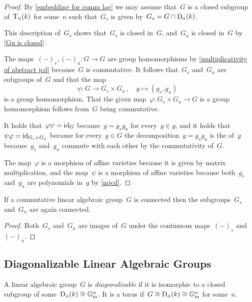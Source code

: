 \begin{proof}
  By \cref{embedding for comm lag} we may assume that~$G$ is a closed subgroup of~$\operatorname{T}_n(k)$ for some~$n$ such that~$G_s$ is given by~$G_s = G \cap \operatorname{D}_n(k)$.
  
  This description of~$G_s$ shows that~$G_s$ is closed in~$G$, and~$G_u$ is closed in~$G$ by \cref{Gu is closed}.
  
  The maps~$(-)_s, (-)_u \colon G \to G$ are group homomorphisms by \cref{multiplicativity of abstract jcd} because~$G$ is commutative.
  It follows that~$G_s$ and~$G_u$ are subgroups of~$G$ and that the map
  \[
            \psi
    \colon  G
    \to     G_s \times G_u \,,
    \quad   g
    \mapsto (g_s, g_u)
  \]
  is a group homomorphism.
  That the given map~$\varphi \colon G_s \times G_u \to G$ is a group homomorphism follows from~$G$ being commutative.
  
  It holds that~$\varphi \psi = \operatorname{id}_G$ because~$g = g_s g_u$ for every~$g \in g$, and it holds that~$\psi \varphi = \operatorname{id}_{G_s \times G_u}$ because for every~$g \in G$ the decomposition~$g = g_s g_u$ is the {\JCD} of~$g$ because~$g_s$ and~$g_u$ commute with each other by the commutativity of~$G$.
  
  The map~$\varphi$ is a morphism of affine varieties because it is given by matrix multiplication, and the map~$\psi$ is a morphism of affine varieties because both~$g_s$ and~$g_u$ are polynomials in~$g$ by \cref{mjcd}.
\end{proof}


\begin{corollary}
  If a commutative linear algebraic group~$G$ is connected then the subgroups~$G_s$ and~$G_u$ are again connected.
\end{corollary}


\begin{proof}
  Both~$G_s$ and~$G_u$ are images of~$G$ under the continuous maps~$(-)_s$ and~$(-)_u$.
\end{proof}





\subsection{Diagonalizable Linear Algebraic Groups}


\begin{definition}
  A linear algebraic group~$G$ is \emph{diagonalizable} if it is isomorphic to a closed subgroup of some~$\operatorname{D}_n(k) \cong \mathbb{G}_{\text{m}}^n$.
  It is a torus if~$G \cong \operatorname{D}_n(k) \cong \mathbb{G}_{\text{m}}^n$ for some~$n$.
\end{definition}


